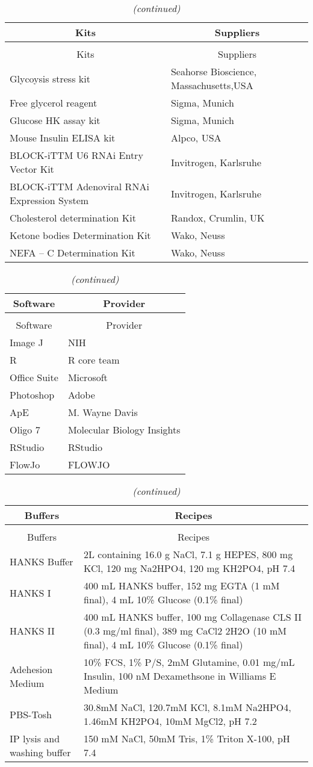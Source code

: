 \setlongtables\begin{longtable}{ll}\caption{kit} \tabularnewline
\hline\hline
\multicolumn{1}{c}{Kits}&\multicolumn{1}{c}{Suppliers}\tabularnewline
\hline
\endfirsthead\caption[]{\em (continued)} \tabularnewline
\hline
\multicolumn{1}{c}{Kits}&\multicolumn{1}{c}{Suppliers}\tabularnewline
\hline
\endhead
\hline
\endfoot
\label{kit}
Glycoysis stress kit&Seahorse Bioscience, Massachusetts,USA\tabularnewline
Free glycerol reagent&Sigma, Munich\tabularnewline
Glucose HK assay kit&Sigma, Munich\tabularnewline
Mouse Insulin ELISA kit&Alpco, USA\tabularnewline
BLOCK-iTTM U6 RNAi Entry Vector Kit &Invitrogen, Karlsruhe \tabularnewline
BLOCK-iTTM Adenoviral RNAi Expression System &Invitrogen, Karlsruhe \tabularnewline
Cholesterol determination Kit&Randox, Crumlin, UK \tabularnewline
Ketone bodies Determination Kit &Wako, Neuss\tabularnewline
NEFA – C Determination Kit&Wako, Neuss\tabularnewline
\hline
\end{longtable}
\setlongtables\begin{longtable}{ll}\caption{software} \tabularnewline
\hline\hline
\multicolumn{1}{c}{Software}&\multicolumn{1}{c}{Provider}\tabularnewline
\hline
\endfirsthead\caption[]{\em (continued)} \tabularnewline
\hline
\multicolumn{1}{c}{Software}&\multicolumn{1}{c}{Provider}\tabularnewline
\hline
\endhead
\hline
\endfoot
\label{software}
Image J&NIH\tabularnewline
R&R core team\tabularnewline
Office Suite&Microsoft\tabularnewline
Photoshop&Adobe\tabularnewline
ApE&M. Wayne Davis\tabularnewline
Oligo 7&Molecular Biology Insights\tabularnewline
RStudio&RStudio\tabularnewline
FlowJo&FLOWJO\tabularnewline
\hline
\end{longtable}
\setlongtables\begin{longtable}{ll}\caption{buffers} \tabularnewline
\hline\hline
\multicolumn{1}{c}{Buffers}&\multicolumn{1}{c}{Recipes}\tabularnewline
\hline
\endfirsthead\caption[]{\em (continued)} \tabularnewline
\hline
\multicolumn{1}{c}{Buffers}&\multicolumn{1}{c}{Recipes}\tabularnewline
\hline
\endhead
\hline
\endfoot
\label{buffers}
HANKS Buffer&2L containing 16.0 g NaCl, 7.1 g HEPES, 800 mg KCl, 120 mg Na2HPO4, 120 mg KH2PO4, pH 7.4\tabularnewline
HANKS I&400 mL HANKS buffer, 152 mg EGTA (1 mM final), 4 mL 10\% Glucose (0.1\% final)\tabularnewline
HANKS II&400 mL HANKS buffer, 100 mg Collagenase CLS II (0.3 mg/ml final), 389 mg CaCl2 2H2O (10 mM final), 4 mL 10\% Glucose (0.1\% final)\tabularnewline
Adehesion Medium&10\% FCS, 1\% P/S, 2mM Glutamine, 0.01 mg/mL Insulin, 100 nM Dexamethsone in Williams E Medium \tabularnewline
PBS-Tosh&30.8mM NaCl, 120.7mM KCl, 8.1mM Na2HPO4, 1.46mM KH2PO4, 10mM MgCl2, pH 7.2\tabularnewline
IP lysis and washing buffer&150 mM NaCl, 50mM Tris, 1\% Triton X-100, pH 7.4\tabularnewline
\hline
\end{longtable}
